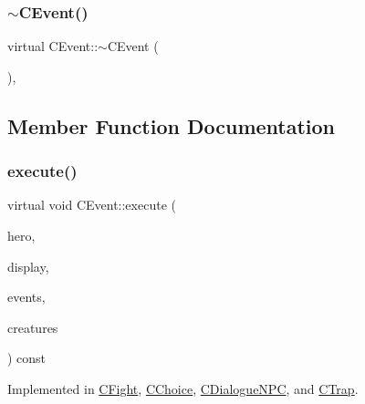 \mbox{\label{class_c_event_a6e20daa780afcb3927b14649d70364c7}} 
\subsubsection{\texorpdfstring{$\sim$\+C\+Event()}{~CEvent()}}
{\footnotesize\ttfamily virtual C\+Event\+::$\sim$\+C\+Event (\begin{DoxyParamCaption}{ }\end{DoxyParamCaption})\hspace{0.3cm}{\ttfamily [virtual]}, {\ttfamily [default]}}



\subsection{Member Function Documentation}
\mbox{\label{class_c_event_a46bd2925f7f19c5c0d6adf2b1e6e3f70}} 
\subsubsection{\texorpdfstring{execute()}{execute()}}
{\footnotesize\ttfamily virtual void C\+Event\+::execute (\begin{DoxyParamCaption}\item[{\mbox{\hyperlink{class_c_hero}{C\+Hero}} \&}]{hero,  }\item[{const \mbox{\hyperlink{class_c_display}{C\+Display}} \&}]{display,  }\item[{const std\+::map$<$ int, const \mbox{\hyperlink{class_c_event}{C\+Event}} $\ast$$>$ \&}]{events,  }\item[{const std\+::map$<$ int, const \mbox{\hyperlink{class_c_creature}{C\+Creature}} $\ast$$>$ \&}]{creatures }\end{DoxyParamCaption}) const\hspace{0.3cm}{\ttfamily [pure virtual]}}



Implemented in \mbox{\hyperlink{class_c_fight_ac820b62e70990ddc90ecb959f4497f8f}{C\+Fight}}, \mbox{\hyperlink{class_c_choice_aeccaa71a8fcd358215fe0ddbc37ab143}{C\+Choice}}, \mbox{\hyperlink{class_c_dialogue_n_p_c_a6a7d83e9c13789f6804a8b5323d572f8}{C\+Dialogue\+N\+PC}}, and \mbox{\hyperlink{class_c_trap_a0b0925310ffbfa28f877ac5669f8bb20}{C\+Trap}}.

